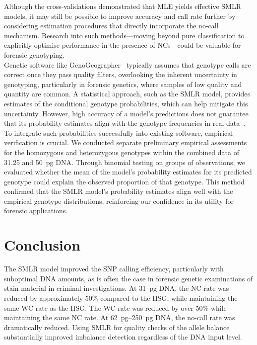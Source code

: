 \documentclass[preprint,5p,times,11pt]{elsarticle}
\begin{document}
Although the cross-validations demonstrated that MLE yields effective SMLR models, it may still be possible to improve accuracy and call rate further by considering estimation procedures that directly incorporate the no-call mechanism.
Research into such methods---moving beyond pure classification to explicitly optimise performance in the presence of NCs---could be valuable for forensic genotyping.\\


Genetic software like GenoGeographer~\cite{tvede18, tvede17, genogeographer} typically assumes that genotype calls are correct once they pass quality filters, overlooking the inherent uncertainty in genotyping, particularly in forensic genetics, where samples of low quality and quantity are common.
A statistical approach, such as the SMLR model, provides estimates of the conditional genotype probabilities, which can help mitigate this uncertainty.
However, high accuracy of a model's predictions does not guarantee that its probability estimates align with the genotype frequencies in real data~\cite{shmueli}.
To integrate such probabilities successfully into existing software, empirical verification is crucial.
We conducted separate preliminary empirical assessments for the homozygous and heterozygous genotypes within the combined data of 31.25 and \SI{50}{\pg} DNA.
Through binomial testing on groups of observations, we evaluated whether the mean of the model’s probability estimates for its predicted genotype could explain the observed proportion of that genotype.
This method confirmed that the SMLR model's probability estimates align well with the empirical genotype distributions, reinforcing our confidence in its utility for forensic applications.



\section{Conclusion}
The SMLR model improved the SNP calling efficiency, particularly with suboptimal DNA amounts, as is often the case in forensic genetic examinations of stain material in criminal investigations.
At \SI{31}{\pg} DNA, the NC rate was reduced by approximately 50\% compared to the HSG, while maintaining the same WC rate as the HSG.
The WC rate was reduced by over 50\% while maintaining the same NC rate.
At \SIrange[range-units = single, range-phrase = --]{62}{250}{\pg} DNA, the no-call rate was dramatically reduced.
Using SMLR for quality checks of the allele balance substantially improved imbalance detection regardless of the DNA input level.
\end{document}
